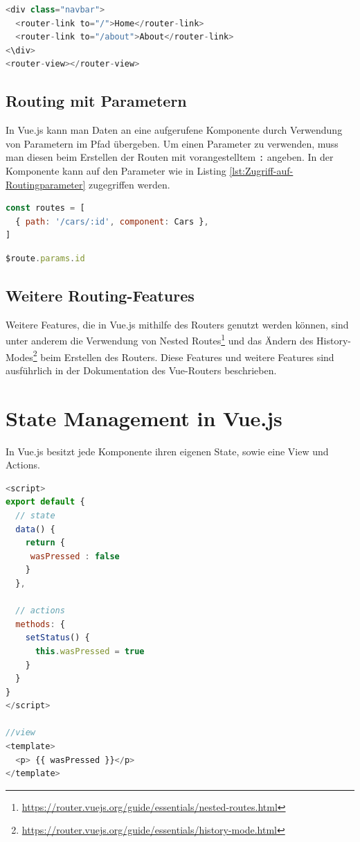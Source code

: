\begin{lstlisting}[caption={Verwendung des Routers},language=javascript,label={lst:Verwendung-des-Routers}]
<div class="navbar">
  <router-link to="/">Home</router-link>
  <router-link to="/about">About</router-link>
<\div>
<router-view></router-view>
\end{lstlisting}

\subsection*{Routing mit Parametern}
In Vue.js kann man Daten an eine aufgerufene Komponente durch Verwendung von Parametern im Pfad übergeben.
Um einen Parameter zu verwenden, muss man diesen beim Erstellen der Routen mit vorangestelltem \texttt{:} angeben.
In der Komponente kann auf den Parameter wie in Listing \ref{lst:Zugriff-auf-Routingparameter} zugegriffen werden. \cite{vueRouterDynamicRouteMatching}
\begin{lstlisting}[caption={Route mit Parameter},language=javascript,label={lst:Route-mit-Parameter}]
const routes = [
  { path: '/cars/:id', component: Cars },
]
\end{lstlisting}

\begin{lstlisting}[caption={Zugriff auf Routingparameter},language=javascript,label={lst:Zugriff-auf-Routingparameter}]
$route.params.id
\end{lstlisting}

\subsection*{Weitere Routing-Features}
Weitere Features, die in Vue.js mithilfe des Routers genutzt werden können,
sind unter anderem die Verwendung von Nested Routes\footnote{\url{https://router.vuejs.org/guide/essentials/nested-routes.html}}
und das Ändern des History-Modes\footnote{\url{https://router.vuejs.org/guide/essentials/history-mode.html}} beim Erstellen des Routers.
Diese Features und weitere Features sind ausführlich in der Dokumentation des Vue-Routers beschrieben.


\section{State Management in Vue.js}\label{sec:state-management-in-vue.js}
In Vue.js besitzt jede Komponente ihren eigenen State, sowie eine View und Actions.
\begin{lstlisting}[caption={State, View und Actions},language=javascript,label={lst:State-View-und-Actions}]
<script>
export default {
  // state
  data() {
    return {
     wasPressed : false
    }
  },

  // actions
  methods: {
    setStatus() {
      this.wasPressed = true
    }
  }
}
</script>

//view
<template>
  <p> {{ wasPressed }}</p>
</template>
\end{lstlisting}

